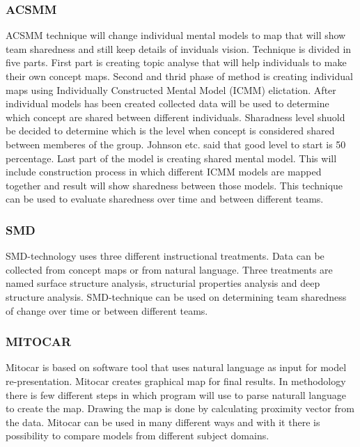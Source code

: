 \documentclass[english]{tktltiki2}
\theoremstyle{definition}
\theoremstyle{remark}
\begin{document}
\subsubsection{ACSMM}

ACSMM technique will change individual mental models to map that will show team sharedness and still keep details of inviduals vision. Technique is divided in five parts. First part is creating topic analyse that will help  individuals to make their own concept maps. Second and thrid phase of method is creating individual maps using Individually Constructed Mental Model (ICMM) elictation. After individual models has been created collected data will be used to determine which concept are shared between different individuals. Sharadness level shuold be decided to determine which is the level when concept is considered shared between memberes of the group. Johnson etc. said that good level to start is 50 percentage\cite{mentalModelResearch}. Last part of the model is creating shared mental model. This will include construction process in which different ICMM models are mapped together and result will show sharedness between those models. This technique can be used to evaluate sharedness over time and between different teams\cite{mentalModelResearch}.

\subsubsection{SMD}

SMD-technology uses three different instructional treatments. Data can be collected from concept maps or from natural language. Three treatments are named surface structure analysis, structurial properties analysis and deep structure analysis. SMD-technique can be used on determining team sharedness of change over time or between different teams\cite{mentalModelResearch}.

\subsubsection{MITOCAR}

Mitocar is based on software tool that uses natural language as input for model re-presentation. Mitocar creates graphical map for final results. In methodology there is few different steps in which program will use to parse naturall language to create the map. Drawing the map is done by calculating proximity vector from the data. Mitocar can be used in many different ways and with it there is possibility to compare models from different subject domains.
\end{document}
